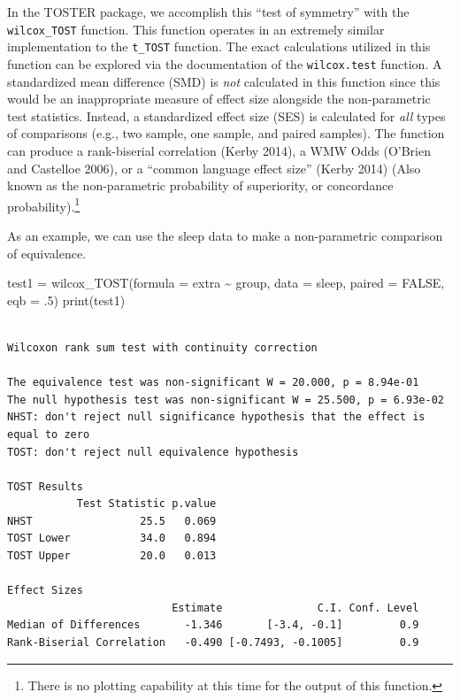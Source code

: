 \documentclass[
]{interact}
\newenvironment{Shaded}{\begin{snugshade}}{\end{snugshade}}
\newcommand{\AttributeTok}[1]{\textcolor[rgb]{0.40,0.45,0.13}{#1}}
\newcommand{\ConstantTok}[1]{\textcolor[rgb]{0.56,0.35,0.01}{#1}}
\newcommand{\DecValTok}[1]{\textcolor[rgb]{0.68,0.00,0.00}{#1}}
\newcommand{\FunctionTok}[1]{\textcolor[rgb]{0.28,0.35,0.67}{#1}}
\newcommand{\NormalTok}[1]{\textcolor[rgb]{0.00,0.23,0.31}{#1}}
\newcommand{\OtherTok}[1]{\textcolor[rgb]{0.00,0.23,0.31}{#1}}
\newcommand{\SpecialCharTok}[1]{\textcolor[rgb]{0.37,0.37,0.37}{#1}}
\begin{document}
In the TOSTER package, we accomplish this ``test of symmetry'' with the
\texttt{wilcox\_TOST} function. This function operates in an extremely
similar implementation to the \texttt{t\_TOST} function. The exact
calculations utilized in this function can be explored via the
documentation of the \texttt{wilcox.test} function. A standardized mean
difference (SMD) is \emph{not} calculated in this function since this
would be an inappropriate measure of effect size alongside the
non-parametric test statistics. Instead, a standardized effect size
(SES) is calculated for \emph{all} types of comparisons (e.g., two
sample, one sample, and paired samples). The function can produce a
rank-biserial correlation (Kerby 2014), a WMW Odds (O'Brien and
Castelloe 2006), or a ``common language effect size'' (Kerby 2014) (Also
known as the non-parametric probability of superiority, or concordance
probability).\footnote{There is no plotting capability at this time for
  the output of this function.}

\newpage

As an example, we can use the sleep data to make a non-parametric
comparison of equivalence.

\begin{Shaded}
\begin{Highlighting}[]
\NormalTok{test1 }\OtherTok{=} \FunctionTok{wilcox\_TOST}\NormalTok{(}\AttributeTok{formula =}\NormalTok{ extra }\SpecialCharTok{\textasciitilde{}}\NormalTok{ group,}
                      \AttributeTok{data =}\NormalTok{ sleep,}
                      \AttributeTok{paired =} \ConstantTok{FALSE}\NormalTok{,}
                      \AttributeTok{eqb =}\NormalTok{ .}\DecValTok{5}\NormalTok{)}
\FunctionTok{print}\NormalTok{(test1)}
\end{Highlighting}
\end{Shaded}

\begin{verbatim}

Wilcoxon rank sum test with continuity correction

The equivalence test was non-significant W = 20.000, p = 8.94e-01
The null hypothesis test was non-significant W = 25.500, p = 6.93e-02
NHST: don't reject null significance hypothesis that the effect is equal to zero 
TOST: don't reject null equivalence hypothesis

TOST Results 
           Test Statistic p.value
NHST                 25.5   0.069
TOST Lower           34.0   0.894
TOST Upper           20.0   0.013

Effect Sizes 
                          Estimate               C.I. Conf. Level
Median of Differences       -1.346       [-3.4, -0.1]         0.9
Rank-Biserial Correlation   -0.490 [-0.7493, -0.1005]         0.9
\end{verbatim}
\end{document}
